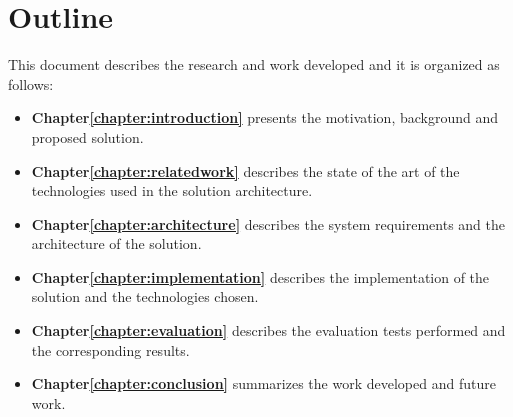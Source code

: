 \section{Outline}
This document describes the research and work developed and it is organized as follows:

\begin{itemize}
\item \textbf{Chapter\ref{chapter:introduction}} presents the motivation, background and proposed solution.
\item \textbf{Chapter\ref{chapter:relatedwork}} describes the state of the art of the technologies used in the solution architecture.
\item \textbf{Chapter\ref{chapter:architecture}} describes the system requirements and the architecture of the solution.
\item \textbf{Chapter\ref{chapter:implementation}} describes the implementation of the solution and the technologies chosen.
\item \textbf{Chapter\ref{chapter:evaluation}} describes the evaluation tests performed and the corresponding results.
\item \textbf{Chapter\ref{chapter:conclusion}} summarizes the work developed and future work.
\end{itemize}

\cleardoublepage
